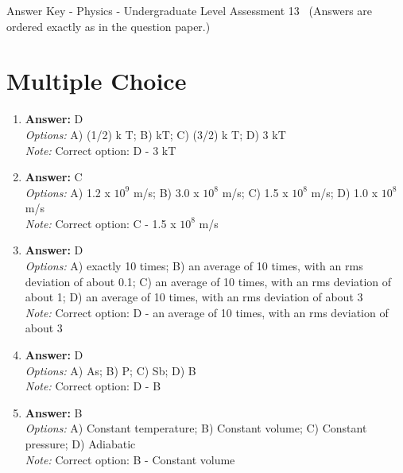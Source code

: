 \documentclass[12pt]{article}
\begin{document}
\begin{center}
Answer Key - Physics - Undergraduate Level Assessment 13 \
\small (Answers are ordered exactly as in the question paper.)
\end{center}

\section*{Multiple Choice}
\begin{enumerate}[label=\arabic*.]
\item \textbf{Answer:} D
\\ \textit{Options:} A) (1/2) k T; B) kT; C) (3/2) k T; D) 3 kT
\\ \textit{Note:} Correct option: D - 3 kT
\item \textbf{Answer:} C
\\ \textit{Options:} A) 1.2 x $10^9$ m/s; B) 3.0 x $10^8$ m/s; C) 1.5 x $10^8$ m/s; D) 1.0 x $10^8$ m/s
\\ \textit{Note:} Correct option: C - 1.5 x $10^8$ m/s
\item \textbf{Answer:} D
\\ \textit{Options:} A) exactly 10 times; B) an average of 10 times, with an rms deviation of about 0.1; C) an average of 10 times, with an rms deviation of about 1; D) an average of 10 times, with an rms deviation of about 3
\\ \textit{Note:} Correct option: D - an average of 10 times, with an rms deviation of about 3
\item \textbf{Answer:} D
\\ \textit{Options:} A) As; B) P; C) Sb; D) B
\\ \textit{Note:} Correct option: D - B
\item \textbf{Answer:} B
\\ \textit{Options:} A) Constant temperature; B) Constant volume; C) Constant pressure; D) Adiabatic
\\ \textit{Note:} Correct option: B - Constant volume
\end{enumerate}
\end{document}
